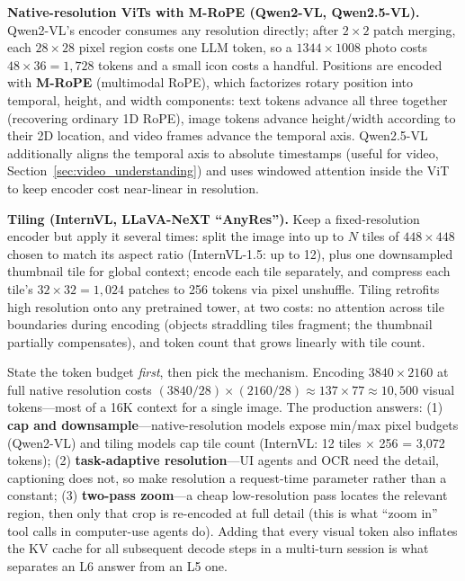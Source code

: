 \textbf{Native-resolution ViTs with M-RoPE (Qwen2-VL, Qwen2.5-VL).} Qwen2-VL's encoder consumes any resolution directly; after $2 \times 2$ patch merging, each $28 \times 28$ pixel region costs one LLM token, so a $1344 \times 1008$ photo costs $48 \times 36 = 1{,}728$ tokens and a small icon costs a handful. Positions are encoded with \textbf{M-RoPE} (multimodal RoPE), which factorizes rotary position into temporal, height, and width components: text tokens advance all three together (recovering ordinary 1D RoPE), image tokens advance height/width according to their 2D location, and video frames advance the temporal axis. Qwen2.5-VL additionally aligns the temporal axis to absolute timestamps (useful for video, Section~\ref{sec:video_understanding}) and uses windowed attention inside the ViT to keep encoder cost near-linear in resolution.

\textbf{Tiling (InternVL, LLaVA-NeXT ``AnyRes'').} Keep a fixed-resolution encoder but apply it several times: split the image into up to $N$ tiles of $448 \times 448$ chosen to match its aspect ratio (InternVL-1.5: up to 12), plus one downsampled thumbnail tile for global context; encode each tile separately, and compress each tile's $32 \times 32 = 1{,}024$ patches to 256 tokens via pixel unshuffle. Tiling retrofits high resolution onto any pretrained tower, at two costs: no attention across tile boundaries during encoding (objects straddling tiles fragment; the thumbnail partially compensates), and token count that grows linearly with tile count.

\begin{keyinsight}
State the token budget \textit{first}, then pick the mechanism. Encoding $3840 \times 2160$ at full native resolution costs $(3840/28) \times (2160/28) \approx 137 \times 77 \approx 10{,}500$ visual tokens---most of a 16K context for a single image. The production answers: (1) \textbf{cap and downsample}---native-resolution models expose min/max pixel budgets (Qwen2-VL) and tiling models cap tile count (InternVL: 12 tiles $\times$ 256 = 3{,}072 tokens); (2) \textbf{task-adaptive resolution}---UI agents and OCR need the detail, captioning does not, so make resolution a request-time parameter rather than a constant; (3) \textbf{two-pass zoom}---a cheap low-resolution pass locates the relevant region, then only that crop is re-encoded at full detail (this is what ``zoom in'' tool calls in computer-use agents do). Adding that every visual token also inflates the KV cache for all subsequent decode steps in a multi-turn session is what separates an L6 answer from an L5 one.
\end{keyinsight}


